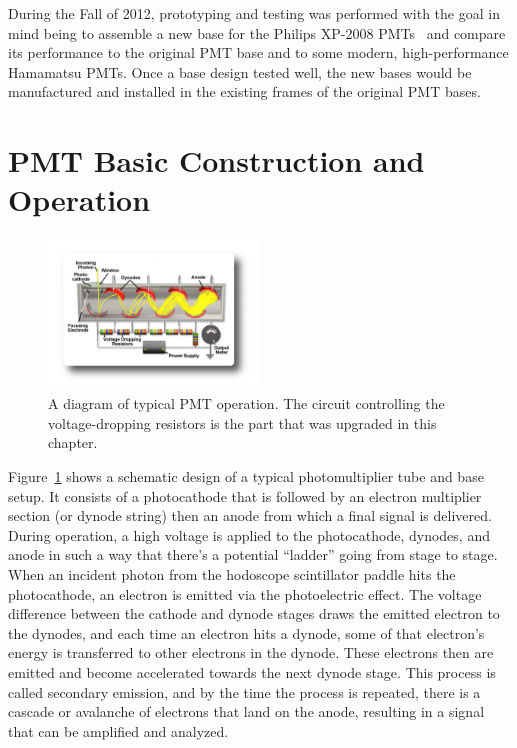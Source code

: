 During the Fall of 2012, prototyping and testing was performed with the goal in mind being to assemble a new base for the Philips XP-2008 PMTs~\cite{tubespecs} and compare its performance to the original PMT base and to some modern, high-performance Hamamatsu PMTs. Once a base design tested well, the new bases would be manufactured and installed in the existing frames of the original PMT bases.

\section{PMT Basic Construction and Operation}

\begin{figure}
	\centering
	\includegraphics[width=0.5\textwidth]{figures/pmt-diagram.png}
	\caption{A diagram of typical PMT operation. The circuit controlling the voltage-dropping resistors is the part that was upgraded in this chapter.}
	\label{fig:pmt}
\end{figure}

Figure~\ref{fig:pmt} shows a schematic design of a typical photomultiplier tube and base setup. It consists of a photocathode that is followed by an electron multiplier section (or dynode string) then an anode from which a final signal is delivered. During operation, a high voltage is applied to the photocathode, dynodes, and anode in such a way that there's a potential ``ladder'' going from stage to stage. When an incident photon from the hodoscope scintillator paddle hits the photocathode, an electron is emitted via the photoelectric effect. The voltage difference between the cathode and dynode stages draws the emitted electron to the dynodes, and each time an electron hits a dynode, some of that electron's energy is transferred to other electrons in the dynode. These electrons then are emitted and become accelerated towards the next dynode stage. This process is called secondary emission, and by the time the process is repeated, there is a cascade or avalanche of electrons that land on the anode, resulting in a signal that can be amplified and analyzed.

